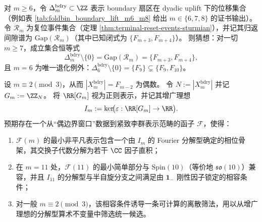 

\begin{conjecture}\label{conj:bdry-uplift-delta-equals-reset-gaps}
对 \(m\ge 6\)，令 \(\Delta_m^{\mathrm{bdry}}\subset\ZZ\) 表示 boundary 扇区在 dyadic uplift 下的位移集合（例如表 \ref{tab:foldbin_boundary_lift_m6_m8} 给出 \(m\in\{6,7,8\}\) 的证书输出）。
令 \(\mathcal R_m\) 为复位事件集合（定理 \ref{thm:terminal-reset-events-sturmian}），并记其归返间隙谱为 \(\mathrm{Gap}(\mathcal R_m)\)（其中已知闭式为 \(\{F_{m+3},F_{m+4}\}\)）。
则猜想：对一切 \(m\ge 7\)，成立集合恒等式
\[
\Delta_m^{\mathrm{bdry}}\setminus\{0\}=\mathrm{Gap}(\mathcal R_m)=\{F_{m+3},F_{m+4}\},
\]
且 \(m=6\) 为唯一退化例外：\(\Delta_6^{\mathrm{bdry}}\setminus\{0\}=\{F_9\}\subsetneq \{F_9,F_{10}\}\)。
\end{conjecture}

\begin{conjecture}[偶边界窗口的增广理想与统一候选的函子化匹配公理]\label{conj:profinite-gut-augmentation-ideal-functor}
设 \(m\equiv 2\pmod 3\)，从而 \(|X_m^{\mathrm{bdry}}|=F_{m-2}\) 为偶数。
令 \(N:=|X_m^{\mathrm{bdry}}|\) 并记 \(G_m:=\ZZ_N\)。
将 \(\RR[G_m]\) 视为正则表示，并记其增广理想
\[
I_m:=\ker\!\bigl(\varepsilon:\RR[G_m]\to\RR\bigr).
\]
预期存在一个从“偶边界窗口”数据到紧致李群表示范畴的函子 \(\mathcal F\)，使得：
\begin{enumerate}
  \item \(\mathcal F(m)\) 的最小非平凡表示包含一个由 \(I_m\) 的 Fourier 分解型确定的相位骨架，其交换子代数分解为若干 \(\CC\) 因子直积；
  \item 在 \(m=11\) 处，\(\mathcal F(11)\) 的最小简单部分与 \(\mathrm{Spin}(10)\)（等价地 \(\mathfrak{so}(10)\)）兼容，并且 \(I_{11}\) 的分解型与半自旋分支之间满足由 \(\mathbf 1_{-}\) 刚性因子锁定的相容条件；
  \item 对一般 \(m\equiv 2\pmod 3\)，该相容条件诱导一条可计算的离散筛法，用以从增广理想的分解型算术不变量中筛选统一候选。
\end{enumerate}
\end{conjecture}

